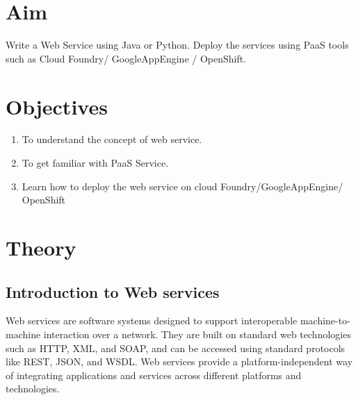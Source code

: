 \documentclass[11pt]{article}
\begin{document}
\tableofcontents
\thispagestyle{empty}
\clearpage

\setcounter{page}{1}

\section{Aim}
Write a Web Service using Java or Python. Deploy the services using PaaS tools such as
Cloud Foundry/ GoogleAppEngine / OpenShift.

\section{Objectives}
\begin{enumerate}
    \item To understand the concept of web service.
    \item To get familiar with PaaS Service.
    \item Learn how to deploy the web service on cloud Foundry/GoogleAppEngine/ OpenShift
\end{enumerate}

\section{Theory}

\subsection{Introduction to Web services}

Web services are software systems designed to support interoperable machine-to-machine interaction over a network. They are built on standard web technologies such as HTTP, XML, and SOAP, and can be accessed using standard protocols like REST, JSON, and WSDL. Web services provide a platform-independent way of integrating applications and services across different platforms and technologies.
\end{document}
